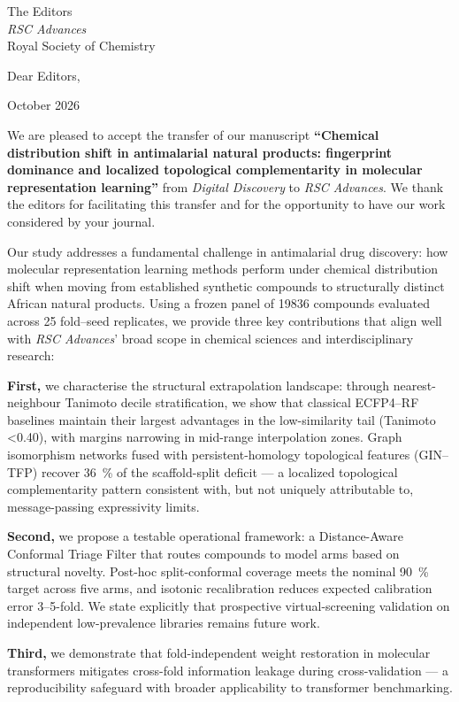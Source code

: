 \documentclass[11pt,a4paper]{letter}
\begin{document}
\begin{letter}{%
  The Editors \\
  \textit{RSC Advances} \\
  Royal Society of Chemistry
}

\opening{Dear Editors,}

 October 2026

We are pleased to accept the transfer of our manuscript \textbf{``Chemical distribution shift in antimalarial natural products: fingerprint dominance and localized topological complementarity in molecular representation learning''} from \textit{Digital Discovery} to \textit{RSC Advances}. We thank the editors for facilitating this transfer and for the opportunity to have our work considered by your journal.

Our study addresses a fundamental challenge in antimalarial drug discovery: how molecular representation learning methods perform under chemical distribution shift when moving from established synthetic compounds to structurally distinct African natural products. Using a frozen panel of \num{19836} compounds evaluated across \num{25} fold--seed replicates, we provide three key contributions that align well with \textit{RSC Advances}' broad scope in chemical sciences and interdisciplinary research:

\textbf{First,} we characterise the structural extrapolation landscape: through nearest-neighbour Tanimoto decile stratification, we show that classical ECFP4--RF baselines maintain their largest advantages in the low-similarity tail (Tanimoto \num{<0.40}), with margins narrowing in mid-range interpolation zones. Graph isomorphism networks fused with persistent-homology topological features (GIN--TFP) recover \qty{36}{\percent} of the scaffold-split deficit --- a localized topological complementarity pattern consistent with, but not uniquely attributable to, message-passing expressivity limits.

\textbf{Second,} we propose a testable operational framework: a Distance-Aware Conformal Triage Filter that routes compounds to model arms based on structural novelty. Post-hoc split-conformal coverage meets the nominal \qty{90}{\percent} target across five arms, and isotonic recalibration reduces expected calibration error \numrange{3}{5}-fold. We state explicitly that prospective virtual-screening validation on independent low-prevalence libraries remains future work.

\textbf{Third,} we demonstrate that fold-independent weight restoration in molecular transformers mitigates cross-fold information leakage during cross-validation --- a reproducibility safeguard with broader applicability to transformer benchmarking.


\end{letter}
\end{document}
